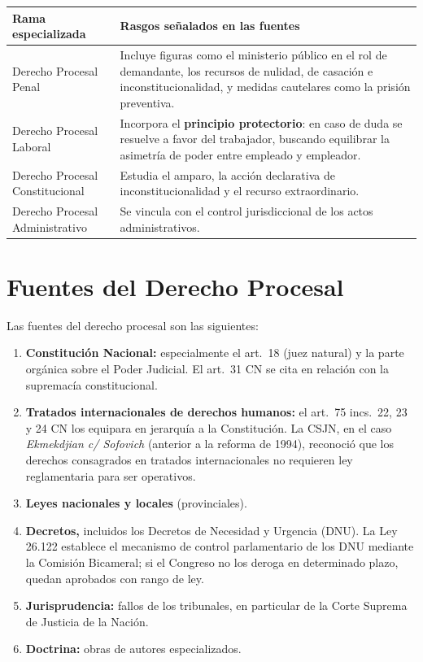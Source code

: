 \documentclass[12pt,oneside]{book}
\renewcommand{\arraystretch}{1.15}
\begin{document}
\begin{table}[H]
\centering
\renewcommand{\arraystretch}{1.25}
\begin{tabularx}{\textwidth}{>{\RaggedRight\arraybackslash}p{}>{\RaggedRight\arraybackslash}X}
\toprule
\textbf{Rama especializada} & \textbf{Rasgos señalados en las fuentes} \\
\midrule
Derecho Procesal Penal & Incluye figuras como el ministerio público en el rol de demandante, los recursos de nulidad, de casación e inconstitucionalidad, y medidas cautelares como la prisión preventiva. \\
\addlinespace
Derecho Procesal Laboral & Incorpora el \textbf{principio protectorio}: en caso de duda se resuelve a favor del trabajador, buscando equilibrar la asimetría de poder entre empleado y empleador. \\
\addlinespace
Derecho Procesal Constitucional & Estudia el amparo, la acción declarativa de inconstitucionalidad y el recurso extraordinario. \\
\addlinespace
Derecho Procesal Administrativo & Se vincula con el control jurisdiccional de los actos administrativos. \\
\bottomrule
\end{tabularx}
\end{table}

\section{Fuentes del Derecho Procesal}

Las fuentes del derecho procesal son las siguientes:

\begin{enumerate}
\item \textbf{Constitución Nacional:} especialmente el art.~18 (juez natural) y la parte orgánica sobre el Poder Judicial. El art.~31 CN se cita en relación con la supremacía constitucional.
\item \textbf{Tratados internacionales de derechos humanos:} el art.~75 incs.~22, 23 y 24 CN los equipara en jerarquía a la Constitución. La CSJN, en el caso \textit{Ekmekdjian c/ Sofovich} (anterior a la reforma de 1994), reconoció que los derechos consagrados en tratados internacionales no requieren ley reglamentaria para ser operativos.
\item \textbf{Leyes nacionales y locales} (provinciales).
\item \textbf{Decretos,} incluidos los Decretos de Necesidad y Urgencia (DNU). La Ley 26.122 establece el mecanismo de control parlamentario de los DNU mediante la Comisión Bicameral; si el Congreso no los deroga en determinado plazo, quedan aprobados con rango de ley.
\item \textbf{Jurisprudencia:} fallos de los tribunales, en particular de la Corte Suprema de Justicia de la Nación.
\item \textbf{Doctrina:} obras de autores especializados.
\end{enumerate}
\end{document}

